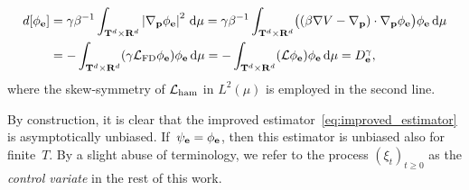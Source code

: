 \documentclass[11pt,a4paper]{article}
\begin{document}
\begin{align}
    \notag
    d[\phi_{\vect e}]
    &= \gamma \beta^{-1} \int_{\torus^d \times \real^d} \abs{\grad_{\vect p} \phi_{\vect e}}^2 \, \d \mu
    = \gamma \beta^{-1} \int_{\torus^d \times \real^d} \bigl((\beta \grad V - \grad_{\vect p}) \cdot \grad_{\vect p}\phi_{\vect e} \bigr) \phi_{\vect e} \, \d \mu  \\
    \label{eq:equivalent_definition_effective_diffusion}
    &= -\int_{\torus^d \times \real^d} (\gamma \mathcal L_{\rm FD} \phi_{\vect e}) \phi_{\vect e} \, \d \mu
    = -\int_{\torus^d \times \real^d} (\mathcal L \phi_{\vect e}) \phi_{\vect e} \, \d \mu
    = D^{\gamma}_{\vect e},
\end{align}
where the skew-symmetry of $\mathcal L_{\rm ham}$ in $L^2(\mu)$ is employed in the second line.

By construction, it is clear that the improved estimator~\eqref{eq:improved_estimator} is asymptotically unbiased.
If~$\psi_{\boldsymbol{\mathbf e}} = \phi_{\boldsymbol{\mathbf e}}$, then this estimator is unbiased also for finite~$T$.
By a slight abuse of terminology,
we refer to the process $(\xi_t)_{t \geq 0}$ as the \emph{control variate} in the rest of this work.

\end{document}
